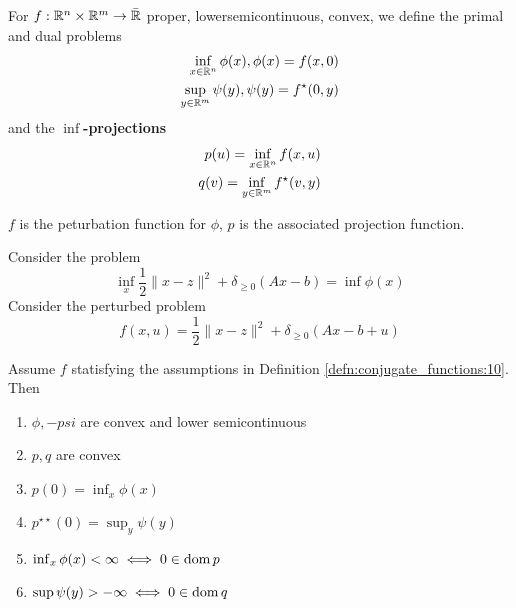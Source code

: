 \begin{defn}
  \label{defn:conjugate_functions:10}
  For $f: \mathbb{R}^{n} \times \mathbb{R}^{m} \rightarrow \bar {\mathbb{R}}$ proper,
  lowersemicontinuous, convex, we define the primal and dual problems
  \begin{align}
    \label{eq:68}
    \inf_{x \in \mathbb{R}^{n}} \phi(x), \phi(x) = f(x, 0) \\
    \sup_{y \in \mathbb{R}^{m}} \psi(y), \psi(y) = f^{\star}(0, y)
  \end{align}
  and the \textbf{$\inf$-projections}
  \begin{align}
    \label{eq:69}
    p(u) = \inf_{x \in \mathbb{R}^{n}} f(x, u) \\
    q(v) = \inf_{y \in \mathbb{R}^{m}} f^{\star}(v, y)
  \end{align}

  $f$ is the peturbation function for $\phi$, $p$ is the associated
  projection function.

  Consider the problem
  \begin{equation}
    \label{eq:70}
    \inf_{x} \frac{1}{2} \| x - z \|^{2} + \delta_{\geq 0} (Ax - b) =
    \inf \phi(x)
  \end{equation}
  Consider the perturbed problem
  \begin{equation}
    \label{eq:71}
    f(x, u) = \frac{1}{2} \| x - z \|^{2} + \delta_{\geq 0} (Ax - b + u)
  \end{equation}
\end{defn}

\begin{proposition}
  Assume $f$ statisfying the assumptions in Definition
  \ref{defn:conjugate_functions:10}.  Then
  \begin{enumerate}
  \item $\phi, -psi$ are convex and lower semicontinuous
  \item $p, q$ are convex
  \item $p(0) = \inf_{x} \phi(x)$
  \item $p^{\star \star}(0) = \sup_{y} \psi(y)$
  \item $\inf_{x} \phi(x) < \infty \iff 0 \in \operatorname*{dom} p$
  \item $\sup \psi(y) > -\infty \iff 0 \in \operatorname*{dom} q$
  \end{enumerate}
\end{proposition}


